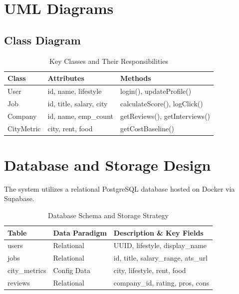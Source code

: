 \section{UML Diagrams}

\subsection{Class Diagram}
\begin{table}[H]
\centering
\caption{Key Classes and Their Responsibilities}
\vspace{0.2cm}
\begin{tabular}{|l|l|l|}
\hline
\textbf{Class} & \textbf{Attributes} & \textbf{Methods} \\ \hline
User & id, name, lifestyle & login(), updateProfile() \\ \hline
Job & id, title, salary, city & calculateScore(), logClick() \\ \hline
Company & id, name, emp\_count & getReviews(), getInterviews() \\ \hline
CityMetric & city, rent, food & getCostBaseline() \\ \hline
\end{tabular}
\end{table}

\section{Database and Storage Design}
The system utilizes a relational PostgreSQL database hosted on Docker via Supabase.

\begin{table}[H]
\centering
\caption{Database Schema and Storage Strategy}
\vspace{0.2cm}
\begin{tabular}{|l|l|p{6cm}|}
\hline
\textbf{Table} & \textbf{Data Paradigm} & \textbf{Description \& Key Fields} \\ \hline
users & Relational & UUID, lifestyle, display\_name \\ \hline
jobs & Relational & id, title, salary\_range, ats\_url \\ \hline
city\_metrics & Config Data & city, lifestyle, rent, food \\ \hline
reviews & Relational & company\_id, rating, pros, cons \\ \hline
\end{tabular}
\end{table}
